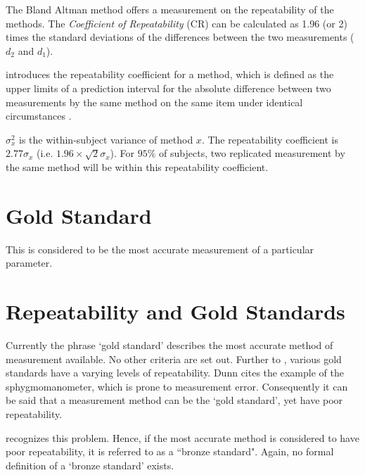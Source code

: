 \documentclass[12pt, a4paper]{report}
\theoremstyle{plain}
\theoremstyle{definition}
\theoremstyle{remark}
\begin{document}
	The Bland Altman method offers a measurement on the repeatability of the methods. The \emph{Coefficient of Repeatability} (CR) can be calculated as 1.96 (or 2) times the standard deviations of the differences between the two measurements ($d_2$ and $d_1$).
	
	

		\citet{BA99} introduces the repeatability coefficient for a method, which is defined as the upper limits of a prediction interval for the absolute difference between two measurements by the same
		method on the same item under identical circumstances \citep{BXC2008}.
		
		$\sigma^2_{x}$ is the within-subject variance of method $x$. The repeatability coefficient is $2.77 \sigma_{x}$ (i.e. $1.96 \times \sqrt{2} \sigma_{x}$). For $95\%$ of subjects, two replicated measurement by the same method will be within this repeatability coefficient.
		
		
	
	
	




	\section{Gold Standard} This is considered to be the most
	accurate measurement of a particular parameter.
		\section{Repeatability and Gold Standards}
		Currently the phrase `gold standard' describes the most accurate method of measurement available. No other criteria are set out. Further to \citet{dunnSEME}, various gold standards have a varying levels of repeatability. Dunn cites the example of the sphygmomanometer, which is prone to measurement error. Consequently it can be said that a measurement method can be the `gold standard', yet have poor repeatability. 
		
		\citet{dunnSEME} recognizes  this problem. Hence, if the most accurate method is considered to have poor repeatability, it is referred to as a ``bronze standard".  Again, no formal definition of a `bronze standard' exists.
		
\end{document}
